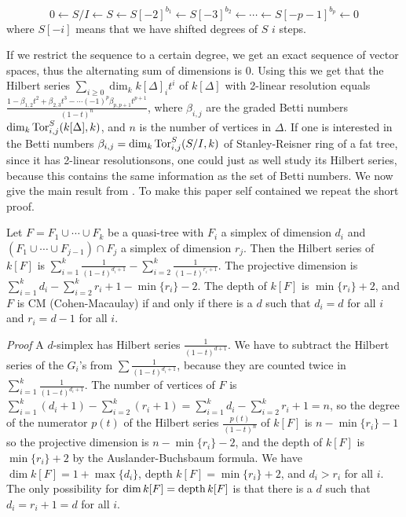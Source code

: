 \documentclass[11pt, oneside]{article}   	%
\begin{document}
$$0\leftarrow S/I\leftarrow S\leftarrow S[-2]^{b_1}\leftarrow S[-3]^{b_2}\leftarrow\cdots\leftarrow S[-p-1]^{b_p}\leftarrow 0$$
where $S[-i]$ means that we have shifted degrees of $S$ $i$ steps.

If we restrict the sequence to a certain degree, we get an exact sequence of vector spaces, thus the alternating sum of dimensions is 0.
Using this we get that the
Hilbert series $\sum_{i\ge0}\dim_kk[\Delta]_it^i$ of $k[\Delta]$ with 2-linear resolution equals 
$\frac{1-\beta_{1,2}t^2+\beta_{2,3}t^3-\cdots(-1)^{p}\beta_{p,p+1}t^{p+1}}{(1-t)^n}$, where $\beta_{i,j}$ are 
the graded Betti numbers $\dim_k{\rm Tor}^S_{i,j}(k[\Delta],k)$, and $n$ is the
number of vertices in $\Delta$.
If one is interested in the Betti numbers $\beta_{i,j}=\dim_k{\rm Tor}^S_{i,j}(S/I,k)$ of
Stanley-Reisner ring of a fat tree, since it has 2-linear resolutionsons, one could just as well study its Hilbert series, because this
contains the same information as the set of Betti numbers. We now give the main result from \cite{f2}. To make this paper self contained
we repeat the short proof.

\begin{theorem}\label{y} Let $F=F_1\cup\cdots\cup F_k$ be a quasi-tree with $F_i$ a simplex of dimension $d_i$
 and $(F_1\cup\cdots\cup F_{j-1})\cap F_j$ a simplex of dimension $r_j$. 
 Then the Hilbert series of $k[F]$
 is $\sum_{i=1}^k\frac{1}{(1-t)^{d_i+1}}-\sum_{i=2}^{k}\frac{1}{(1-t)^{r_i+1}}$.
 The projective dimension is $\sum_{i=1}^kd_i-\sum_{i=2}^kr_i+1-\min\{ r_i\}-2$. 
 The depth of $k[F]$ is $\min\{ r_i\}+2$, and $F$ is CM (Cohen-Macaulay) 
 if and only if there is a $d$ such that
 $d_i=d$ for all $i$ and $r_i=d-1$ for all $i$.
  \end{theorem}
 
 \noindent
 {\em Proof} A $d$-simplex has Hilbert series $\frac{1}{(1-t)^{d+1}}$. We have to subtract the Hilbert series of the $G_i$'s 
 from $\sum\frac{1}{(1-t)^{d_i+1}}$, because they are counted twice in $\sum_{i=1}^k\frac{1}{(1-t)^{d_i+1}}$.
The number of vertices of $F$ is $\sum_{i=1}^k(d_i+1)-\sum_{i=2}^k(r_i+1)=
 \sum_{i=1}^kd_i-\sum_{i=2}^kr_i+1=n$, so the degree of the numerator $p(t)$ of the Hilbert series
 $\frac{p(t)}{(1-t)^n}$ of $k[F]$ is $n-\min\{ r_i\}-1$ so the projective dimension is $n-\min\{ r_i\}-2$,
 and the depth of $k[F]$ is $\min\{ r_i\}+2$ by the Auslander-Buchsbaum formula. We have
 $\dim k[F]=1+\max\{ d_i\}$, depth $k[F]=\min\{ r_i\}+2$, and $d_i>r_i$ for all $i$. The only possibility
 for $\dim k[F]={\rm depth}\, k[F]$ is that there is a $d$ such that $d_i=r_i+1=d$ for all $i$.
 
\end{document}
